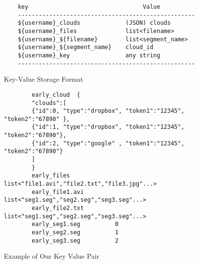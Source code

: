 

\begin{figure*}
\centering
\begin{lstlisting}
    key                                 Value
    ---------------------------------------------------
    ${username}_clouds             (JSON) clouds
    ${username}_files              list<filename>
    ${username}_${filename}        list<segment_name>
    ${username}_${segment_name}    cloud_id
    ${username}_key                any string
    ---------------------------------------------------
\end{lstlisting}
\caption{Key-Value Storage Format}
\label{fig:kv_format}
\end{figure*}


\begin{figure*}
\centering
\begin{lstlisting}
	    early_cloud  {
	    "clouds":[
	    {"id":0, "type":"dropbox", "token1":"12345",  "token2":"67890" },
	    {"id":1, "type":"dropbox", "token1":"12345",  "token2":"67890"},
	    {"id":2, "type":"google" , "token1":"12345",  "token2":"67890"}
	    ]
	    }
	    early_files             list<"file1.avi","file2.txt","file3.jpg"...>
	    early_file1.avi         list<"seg1.seg","seg2.seg","seg3.seg"...>
	    early_file2.txt         list<"seg1.seg","seg2.seg","seg3.seg"...>
	    early_seg1.seg          0
	    early_seg2.seg          1
	    early_seg3.seg          2
\end{lstlisting}
\caption{Example of Our Key Value Pair}
\label{fig:example-kv}
\end{figure*}
																																																																																																																																									      
